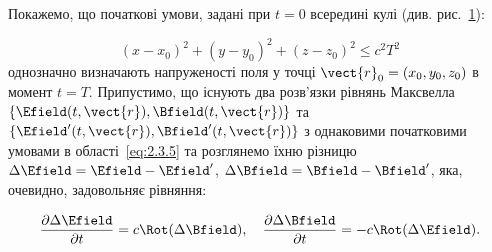 Покажемо, що початкові умови, задані при \( t = 0 \) всередині кулі (див. рис.~\ref{tikz:Unity}):

\begin{equation}
(x - x_0)^2 + (y - y_0)^2 + (z - z_0)^2 \leqslant c^2 T^2 \label{eq:2.3.5}
\end{equation}
однозначно визначають напруженості поля у точці \( \vect{r}_0 = (x_0, y_0, z_0) \) в момент \( t = T \). Припустимо, що існують два розв’язки рівнянь
Максвелла \( \{\Efield(t, \vect{r}), \Bfield(t, \vect{r})\} \) та \( \{\Efield'(t, \vect{r}), \Bfield'(t, \vect{r})\} \) з однаковими початковими
умовами в області~\eqref{eq:2.3.5} та розглянемо їхню різницю \( \Delta \Efield = \Efield - \Efield' \), \( \Delta \Bfield = \Bfield - \Bfield'
\), яка, очевидно, задовольняє рівняння:

\begin{equation*}
\frac{\partial \Delta \Efield}{\partial t} = c  \Rot(\Delta \Bfield), \quad \frac{\partial \Delta \Bfield}{\partial t} = -c
\Rot(\Delta \Efield).
\end{equation*}

\begin{figure}[ht!]\centering
{}
\caption{}
\label{tikz:Unity}
\end{figure}

